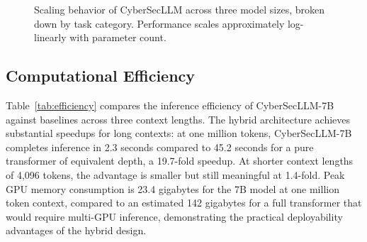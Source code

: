 \documentclass[journal]{IEEEtran}
\newcommand{\modelname}{CyberSecLLM}
\begin{document}
\begin{figure}[!t]
\centering
{}
\caption{Scaling behavior of \modelname{} across three model sizes, broken down by task category. Performance scales approximately log-linearly with parameter count.}
\label{fig:scaling}
\end{figure}

\subsection{Computational Efficiency}
\label{subsec:efficiency}

Table~\ref{tab:efficiency} compares the inference efficiency of \modelname{}-7B against baselines across three context lengths. The hybrid architecture achieves substantial speedups for long contexts: at one million tokens, \modelname{}-7B completes inference in 2.3 seconds compared to 45.2 seconds for a pure transformer of equivalent depth, a 19.7-fold speedup. At shorter context lengths of 4,096 tokens, the advantage is smaller but still meaningful at 1.4-fold. Peak GPU memory consumption is 23.4 gigabytes for the 7B model at one million token context, compared to an estimated 142 gigabytes for a full transformer that would require multi-GPU inference, demonstrating the practical deployability advantages of the hybrid design.
\end{document}
